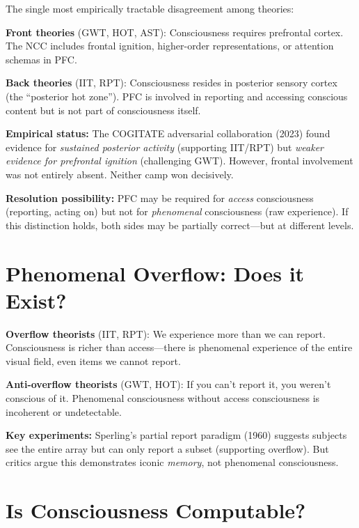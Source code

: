 \documentclass[11pt,a4paper]{report}
\begin{document}
The single most empirically tractable disagreement among theories:

\begin{divergebox}
\textbf{Front theories} (GWT, HOT, AST): Consciousness requires prefrontal cortex. The NCC includes frontal ignition, higher-order representations, or attention schemas in PFC.

\textbf{Back theories} (IIT, RPT): Consciousness resides in posterior sensory cortex (the ``posterior hot zone''). PFC is involved in reporting and accessing conscious content but is not part of consciousness itself.

\textbf{Empirical status:} The COGITATE adversarial collaboration (2023) found evidence for \emph{sustained posterior activity} (supporting IIT/RPT) but \emph{weaker evidence for prefrontal ignition} (challenging GWT). However, frontal involvement was not entirely absent. Neither camp won decisively.

\textbf{Resolution possibility:} PFC may be required for \emph{access} consciousness (reporting, acting on) but not for \emph{phenomenal} consciousness (raw experience). If this distinction holds, both sides may be partially correct---but at different levels.
\end{divergebox}

\section{Phenomenal Overflow: Does it Exist?}

\begin{divergebox}
\textbf{Overflow theorists} (IIT, RPT): We experience more than we can report. Consciousness is richer than access---there is phenomenal experience of the entire visual field, even items we cannot report.

\textbf{Anti-overflow theorists} (GWT, HOT): If you can't report it, you weren't conscious of it. Phenomenal consciousness without access consciousness is incoherent or undetectable.

\textbf{Key experiments:} Sperling's partial report paradigm (1960) suggests subjects see the entire array but can only report a subset (supporting overflow). But critics argue this demonstrates iconic \emph{memory}, not phenomenal consciousness.
\end{divergebox}

\section{Is Consciousness Computable?}
\end{document}
